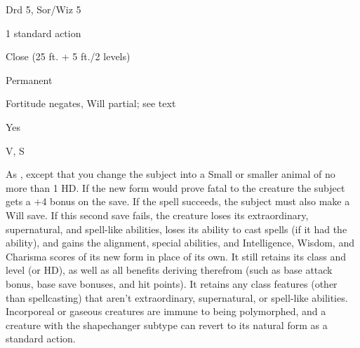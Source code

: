 
\begin{description*}
\item[Level:] Drd 5, Sor/Wiz 5
\item[Casting Time:] 1 standard action
\item[Range:] Close (25 ft. + 5 ft./2 levels)
\item[Duration:] Permanent
\item[Saving Throw:] Fortitude negates, Will partial; see text
\item[Spell Resistance:] Yes
\item[Components:] V, S
\end{description*}

As , except that you change the subject into a Small or smaller
animal of no more than 1 HD. If the new form would prove fatal to the creature
the subject gets a +4 bonus on the save.
If the spell succeeds, the subject must also make a Will save. If this second save
fails, the creature loses its extraordinary, supernatural, and spell-like abilities,
loses its ability to cast spells (if it had the ability), and gains the alignment,
special abilities, and Intelligence, Wisdom, and Charisma scores of its new form
in place of its own. It still retains its class and level (or HD), as well as all
benefits deriving therefrom (such as base attack bonus, base save bonuses, and
hit points). It retains any class features (other than spellcasting) that aren't
extraordinary, supernatural, or spell-like abilities.
Incorporeal or gaseous creatures are immune to being polymorphed, and
a creature with the shapechanger subtype can revert to its natural form as a standard
action.